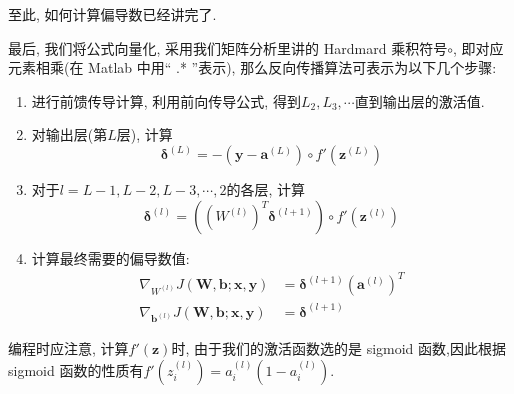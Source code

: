 \documentclass[a4paper,UTF8]{ctexart}
\theoremstyle{plain} \newtheorem{theorem}{定理}[section]
\theoremstyle{plain} \newtheorem{definition}{定义}[section]
\theoremstyle{plain} \newtheorem{lemma}{引理}[section]
\theoremstyle{plain} \newtheorem{proposition}{命题}[section]
\theoremstyle{plain} \newtheorem{example}{例}[section]
\theoremstyle{plain} \newtheorem{remark}{注}[section]
\theoremstyle{plain} \newtheorem{corollary}{推论}[section]
\begin{document}
至此, 如何计算偏导数已经讲完了.

最后, 我们将公式向量化, 采用我们矩阵分析里讲的 Hardmard 乘积符号$\circ$, 即对应元素相乘(在 Matlab 中用“ .* ”表示), 那么反向传播算法可表示为以下几个步骤:
\begin{enumerate}[(1)]
\item 进行前馈传导计算, 利用前向传导公式, 得到$L_{2}, L_{3}, \cdots$直到输出层的激活值.

\item 对输出层(第$L$层), 计算
\begin{equation*}
\bm{\delta}^{(L)} = -(\bm{y} - \bm{a}^{(L)}) \circ f'(\bm{z}^{(L)})
\end{equation*}

\item 对于$l = L-1, L-2, L-3, \cdots, 2$的各层, 计算
\begin{equation*}
\bm{\delta}^{(l)} = ((W^{(l)})^{T} \bm{\delta}^{(l + 1)}) \circ f'(\bm{z}^{(l)})
\end{equation*}

\item 计算最终需要的偏导数值:
\begin{align*}
\nabla_{W^{(l)}} J(\bm{W},\bm{b};\bm{x},\bm{y}) & = \bm{\delta}^{(l+1)} (\bm{a}^{(l)})^{T} \\ 
\nabla_{\bm{b}^{(l)}} J(\bm{W},\bm{b}; \bm{x},\bm{y}) & = \bm{\delta}^{(l+1)}
\end{align*}

\end{enumerate}

编程时应注意, 计算$f'(\bm{z})$时, 由于我们的激活函数选的是 sigmoid 函数,因此根据 sigmoid 函数的性质有$f'(z_{i}^{(l)}) = a_{i}^{(l)} (1 - a_{i}^{(l)})$.
\end{document}

